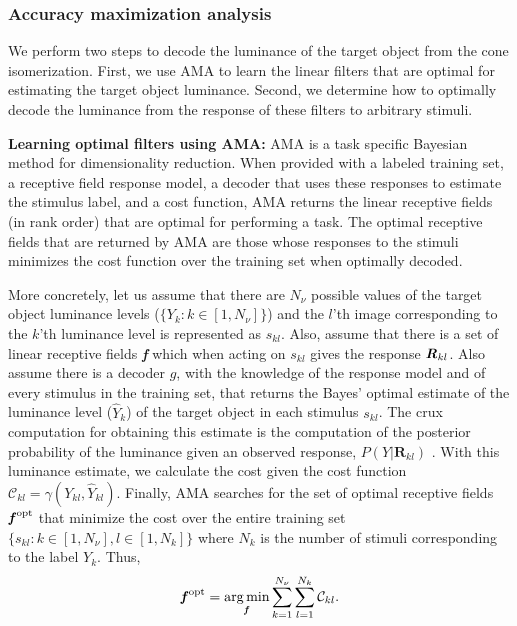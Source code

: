 \documentclass{jov}
\DeclareMathOperator*{\argmin}{arg\,min}
\begin{document}
\subsubsection*{Accuracy maximization analysis}
We perform two steps to decode the luminance of the target object from the cone isomerization. First, we use AMA to learn the linear filters that are optimal for estimating the target object luminance. Second, we determine how to optimally decode the luminance from the response of these filters to arbitrary stimuli.

{\bf Learning optimal filters using AMA:} AMA \cite{geisler2009optimal,burge2017accuracy}
is a task specific Bayesian method for dimensionality reduction. When provided with a labeled training set, a receptive field response model, a decoder that uses these responses to estimate the stimulus label, and a cost function, AMA returns the linear receptive fields (in rank order) that are optimal for performing a task. The optimal receptive fields that are returned by AMA are those whose responses to the stimuli minimizes the cost function over the training set when optimally decoded. 

More concretely, let us assume that there are $N_{\nu}$ possible values of the target object luminance levels ($\{Y_k: k\in[1,N_{\nu}] \}$) and the $l$'th image corresponding to the $k$'th luminance level is represented as $s_{kl}$. Also, assume that there is a set of linear receptive fields {\textbf{\textit f}} which when acting on $s_{kl}$ gives the response ${\textbf{\textit R}}_{kl}$. Also assume there is a decoder $g$, with the knowledge of the response model and of every stimulus in the training set, that returns the Bayes' optimal estimate of the luminance level ($\hat{Y}_k$) of the target object in each stimulus $s_{kl}$. The crux computation for obtaining this estimate is the computation of the posterior probability of the luminance given an observed response, $P(Y|\textbf{R}_{kl})$ \cite{geisler2009optimal,burge2017accuracy}
. With this luminance estimate, we calculate the cost given the cost function $\mathcal{C}_{kl} = \gamma(Y_{kl},\hat{Y}_{kl})$. Finally, AMA searches for the set of optimal receptive fields ${\textbf{\textit f}}^{\rm opt}$ that minimize the cost over the entire training set $\{s_{kl}: k\in[1,N_{\nu}], l\in[1,N_k]\}$ where $N_{k}$ is the number of stimuli corresponding to the label $Y_k$. Thus,
\begin{align}
{\textbf {\textit f} }^{\rm opt} = \argmin_{\textbf {\textit f} } \sum_{k=1}^{N_{\nu}}  \sum_{l=1}^{N_k} {\mathcal{C}}_{kl}.
\label{eq:fopt}
\end{align}
\end{document}
